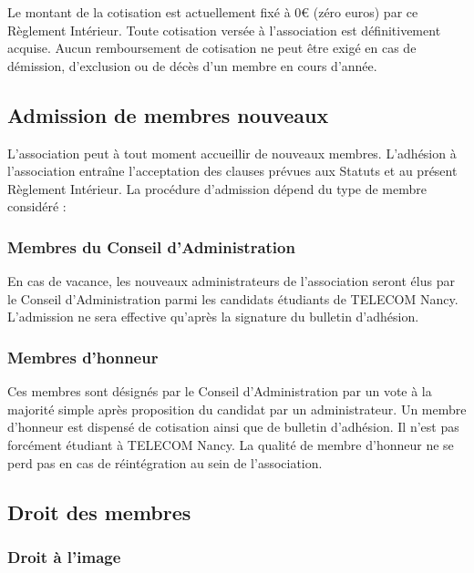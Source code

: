 \documentclass[12pt]{article}
\begin{document}
Le montant de la cotisation est actuellement fixé à 0€ (zéro euros) par ce Règlement Intérieur.
Toute cotisation versée à l’association est définitivement acquise. Aucun remboursement de cotisation ne
peut être exigé en cas de démission, d’exclusion ou de décès d’un membre en cours d’année.

\subsection{Admission de membres nouveaux}
\label{sec:membres:admission}

L’association peut à tout moment accueillir de nouveaux membres. L’adhésion à l’association entraîne
l’acceptation des clauses prévues aux Statuts et au présent Règlement Intérieur. La procédure d’admission
dépend du type de membre considéré :

\subsubsection{Membres du Conseil d’Administration}
\label{sec:membres:admission:conseil}

En cas de vacance, les nouveaux administrateurs de l’association seront élus par le Conseil d’Administration
parmi les candidats étudiants de TELECOM Nancy.
L’admission ne sera effective qu’après la signature du bulletin d’adhésion.

\subsubsection{Membres d’honneur}
\label{sec:membres:admission:honneur}




Ces membres sont désignés par le Conseil d’Administration par un vote à la majorité simple après proposition
du candidat par un administrateur.
Un membre d’honneur est dispensé de cotisation ainsi que de bulletin d’adhésion. Il n’est pas forcément
étudiant à TELECOM Nancy.
La qualité de membre d’honneur ne se perd pas en cas de réintégration au sein de l’association.

\subsection{Droit des membres}
\label{sec:membres:droit}

\subsubsection{Droit à l’image}
\label{sec:membres:droit:image}
\end{document}
